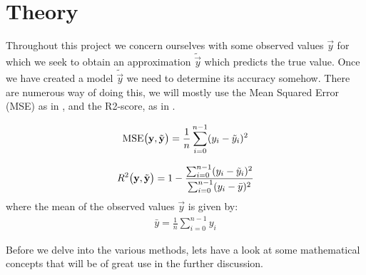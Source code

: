 \section{Theory}\label{sec:theroy}



Throughout this project we concern ourselves with some observed values $\vec{y}$ for which we seek to obtain an approximation $\tilde{\vec{y}}$ which predicts the true value. Once we have created a model $\tilde{\vec{y}}$ we need to determine its accuracy somehow. There are numerous way of doing this, we will mostly use the Mean Squared Error (MSE) as in , and the R2-score, as in .


\begin{align}\label{eq:MSE}
    \text{MSE}\big(\mathbf{y}, \tilde{\mathbf{y}}\big)= \frac{1}{n}\sum_{i=0}^{n-1} (y_i - \tilde{y}_i)^2
\end{align}

\begin{align}\label{eq:R2}
    R^2\big(\mathbf{y}, \tilde{\mathbf{y}}\big) = 1 - \frac{\sum_{i=0}^{n-1}(y_i-\tilde{y}_i)^2}{\sum_{i=0}^{n-1}(y_i-\bar{y})^2}
\end{align}
where the mean of the observed values $\vec{y}$ is given by:
\begin{align*}
    \bar{y} = \frac{1}{n}\sum_{i=0}^{n-1} y_i
\end{align*}


Before we delve into the various methods, lets have a look at some mathematical concepts that will be of great use in the further discussion. 


